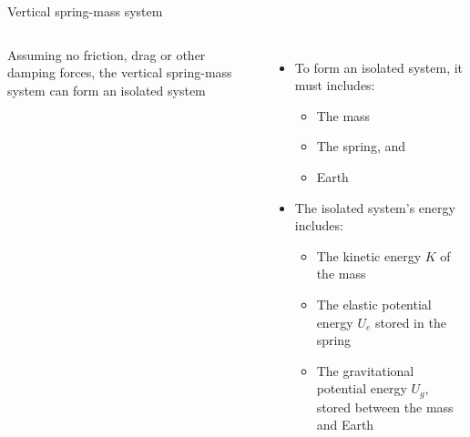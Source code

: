 \documentclass[12pt,compress,aspectratio=169]{beamer}
\begin{document}
\begin{frame}[t]{Vertical spring-mass system}
  \begin{columns}[T]
    \centering

    
    {\color{orange}Assuming no friction, drag or other damping forces}, the
    vertical spring-mass system can form an isolated system
    \begin{itemize}
    \item To form an isolated system, it must includes:
      \begin{itemize}
      \item The mass
      \item The spring, and
      \item Earth
      \end{itemize}
    \item The isolated system's energy includes:
      \begin{itemize}
      \item The kinetic energy $K$ of the mass
      \item The elastic potential energy $U_e$ stored in the spring
      \item The gravitational potential energy $U_g$, stored between the mass
        and Earth
      \end{itemize}
    \end{itemize}
  \end{columns}
\end{frame}
\end{document}
